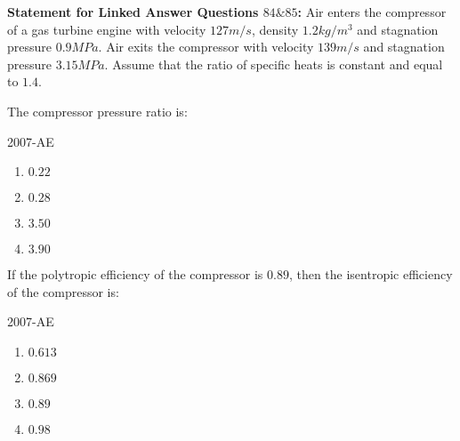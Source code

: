 \textbf{Statement for Linked Answer Questions $84 \& 85$:}
Air enters the compressor of a gas turbine engine with velocity $127 m/s$, density $1.2 kg/m^3$ and stagnation pressure $0.9 MPa$. Air exits the compressor with velocity $139 m/s$ and stagnation pressure $3.15 MPa$. Assume that the ratio of specific heats is constant and equal to $1.4$.\\

\item The compressor pressure ratio is:

\hfill{2007-AE}

\begin{enumerate}
    \item  $0.22$
    \item  $0.28$
    \item  $3.50$
    \item  $3.90$\\
\end{enumerate}

\item If the polytropic efficiency of the compressor is $0.89$, then the isentropic efficiency of the compressor is:

\hfill{2007-AE}

\begin{enumerate}
    \item  $0.613$
    \item  $0.869$
    \item  $0.89$
    \item  $0.98$\\
\end{enumerate}


